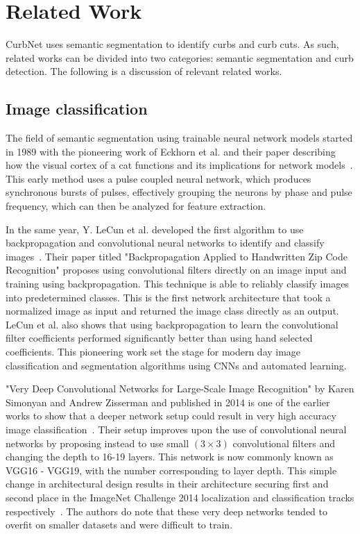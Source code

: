 \chapter{Related Work}\label{chap:relatedwork}
CurbNet uses semantic segmentation to identify curbs and curb cuts.
As such, related works can be divided into two categories: semantic segmentation and curb detection.
The following is a discussion of relevant related works.

\section{Image classification}\label{section:relatedwork-classification}
The field of semantic segmentation using trainable neural network models started in 1989 with the pioneering work of Eckhorn et al. and their paper describing how the visual cortex of a cat functions and its implications for network models~\cite{eckhorncat}.
This early method uses a pulse coupled neural network, which produces synchronous bursts of pulses, effectively grouping the neurons by phase and pulse frequency, which can then be analyzed for feature extraction.

In the same year, Y. LeCun et al. developed the first algorithm to use backpropagation and convolutional neural networks to identify and classify images~\cite{zipcode}.
Their paper titled "Backpropagation Applied to Handwritten Zip Code Recognition" proposes using convolutional filters directly on an image input and training using backpropagation.
This technique is able to reliably classify images into predetermined classes.
This is the first network architecture that took a normalized image as input and returned the image class directly as an output.
LeCun et al. also shows that using backpropagation to learn the convolutional filter coefficients performed significantly better than using hand selected coefficients.
This pioneering work set the stage for modern day image classification and segmentation algorithms using CNNs and automated learning.

"Very Deep Convolutional Networks for Large-Scale Image Recognition" by Karen Simonyan and Andrew Zisserman and published in 2014 is one of the earlier works to show that a deeper network setup could result in very high accuracy image classification~\cite{vgg}.
Their setup improves upon the use of convolutional neural networks by proposing instead to use small $\left(3 \times 3\right)$ convolutional filters and changing the depth to 16-19 layers.
This network is now commonly known as VGG16 - VGG19, with the number corresponding to layer depth.
This simple change in architectural design results in their architecture securing first and second place in the ImageNet Challenge 2014 localization and classification tracks respectively~\cite{vgg}.
The authors do note that these very deep networks tended to overfit on smaller datasets and were difficult to train.

